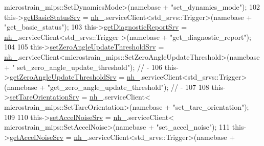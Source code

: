 \begin{DoxyCode}
      microstrain\_mips::SetDynamicsMode>(namebase + \textcolor{stringliteral}{"set\_dynamics\_mode"});
102                 this->\hyperlink{classcl__microstrain__mips_1_1ClMicrostainMips_ab2d9efccc6237800a890135a4249eaf8}{getBasicStatusSrv} = \hyperlink{classcl__microstrain__mips_1_1ClMicrostainMips_a5a39ba0864ba2c4c003b6ea427538243}{nh\_}.serviceClient<std\_srvs::Trigger>(namebase
       + \textcolor{stringliteral}{"get\_basic\_status"});
103                 this->\hyperlink{classcl__microstrain__mips_1_1ClMicrostainMips_a3d4329c798aa4b7cab1320f35f270192}{getDiagnosticReportSrv} = \hyperlink{classcl__microstrain__mips_1_1ClMicrostainMips_a5a39ba0864ba2c4c003b6ea427538243}{nh\_}.serviceClient<std\_srvs::Trigger
      >(namebase + \textcolor{stringliteral}{"get\_diagnostic\_report"});
104 
105                 this->\hyperlink{classcl__microstrain__mips_1_1ClMicrostainMips_a88ffc1e573993764bb130c97cc64fe08}{setZeroAngleUpdateThresholdSrv} = 
      \hyperlink{classcl__microstrain__mips_1_1ClMicrostainMips_a5a39ba0864ba2c4c003b6ea427538243}{nh\_}.serviceClient<microstrain\_mips::SetZeroAngleUpdateThreshold>(namebase + \textcolor{stringliteral}{"
      set\_zero\_angle\_update\_threshold"}); \textcolor{comment}{//  -}
106                 this->\hyperlink{classcl__microstrain__mips_1_1ClMicrostainMips_ae720970f4114e7b6524b59df405ede83}{getZeroAngleUpdateThresholdSrv} = 
      \hyperlink{classcl__microstrain__mips_1_1ClMicrostainMips_a5a39ba0864ba2c4c003b6ea427538243}{nh\_}.serviceClient<std\_srvs::Trigger>(namebase + \textcolor{stringliteral}{"get\_zero\_angle\_update\_threshold"});                     
              \textcolor{comment}{//  -}
107 
108                 this->\hyperlink{classcl__microstrain__mips_1_1ClMicrostainMips_affd28a64d0ee9bcdb116d974f5e19ec6}{setTareOrientationSrv} = \hyperlink{classcl__microstrain__mips_1_1ClMicrostainMips_a5a39ba0864ba2c4c003b6ea427538243}{nh\_}.serviceClient<
      microstrain\_mips::SetTareOrientation>(namebase + \textcolor{stringliteral}{"set\_tare\_orientation"});
109 
110                 this->\hyperlink{classcl__microstrain__mips_1_1ClMicrostainMips_aed9dd96ff81966ea1fce03173a05bcd8}{setAccelNoiseSrv} = \hyperlink{classcl__microstrain__mips_1_1ClMicrostainMips_a5a39ba0864ba2c4c003b6ea427538243}{nh\_}.serviceClient<
      microstrain\_mips::SetAccelNoise>(namebase + \textcolor{stringliteral}{"set\_accel\_noise"});
111                 this->\hyperlink{classcl__microstrain__mips_1_1ClMicrostainMips_ae34d6cfd5e2e990d2fa3afab20ca9c01}{getAccelNoiseSrv} = \hyperlink{classcl__microstrain__mips_1_1ClMicrostainMips_a5a39ba0864ba2c4c003b6ea427538243}{nh\_}.serviceClient<std\_srvs::Trigger>(namebase +

\end{DoxyCode}
